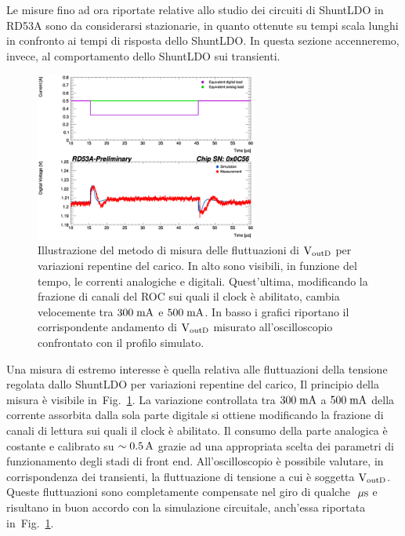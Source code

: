 Le misure fino ad ora riportate relative allo studio dei circuiti di ShuntLDO in RD53A sono da considerarsi stazionarie, in quanto ottenute su tempi scala lunghi in confronto ai tempi di risposta dello ShuntLDO. In questa sezione accenneremo, invece, al comportamento dello ShuntLDO sui transienti.
 
\begin{figure}
\centering
\includegraphics[width=0.65\textwidth]{Immagini/HeadRoom}
\caption{Illustrazione del metodo di misura delle fluttuazioni di $\mathrm{V_{outD}}$ per variazioni repentine del carico. In alto sono visibili, in funzione del tempo, le correnti analogiche e digitali. Quest'ultima, modificando la frazione di canali del ROC sui quali il clock \`e abilitato, cambia velocemente tra $300\rm \; mA$ e $500\rm \; mA$. In basso i grafici riportano il corrispondente andamento di $\mathrm{V_{outD}}$ misurato all'oscilloscopio confrontato con il profilo simulato.}
\label{LoadTransientScope}
\end{figure}
Una misura di estremo interesse è quella relativa alle fluttuazioni della tensione regolata dallo ShuntLDO per variazioni repentine del carico, Il principio della misura \`e visibile in~Fig.~\ref{LoadTransientScope}. La variazione controllata tra $300\rm \; mA$ a $500\rm \; mA$ della corrente assorbita dalla sola parte digitale si ottiene modificando la frazione di canali di lettura sui quali il clock \`e abilitato.  Il consumo della parte analogica \`e costante e calibrato su $\sim 0.5\rm \, A$ grazie ad una appropriata scelta dei parametri di funzionamento degli stadi di front end. All'oscilloscopio \`e possibile valutare, in corrispondenza dei transienti, la fluttuazione di tensione a cui \`e soggetta $\mathrm{V_{outD}}$. Queste fluttuazioni sono completamente compensate nel giro di qualche $\; \mu \rm s$ e risultano in buon accordo con la simulazione circuitale, anch'essa riportata in~Fig.~\ref{LoadTransientScope}. 
